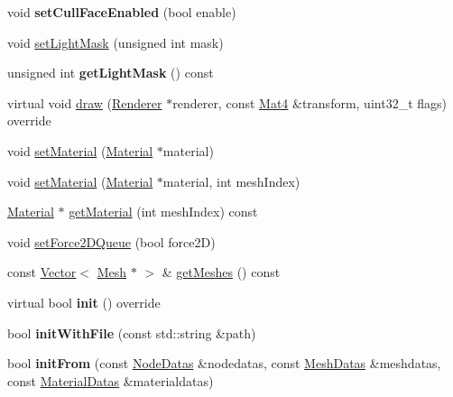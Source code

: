\begin{DoxyCompactItemize}
\item 
\mbox{\label{classSprite3D_acaf719386b479287dc199d9e3eaca85c}} 
void {\bfseries set\+Cull\+Face\+Enabled} (bool enable)
\item 
void \hyperlink{classSprite3D_a0fa47c29a1b6e9cf7a0a2eaa45c1e43a}{set\+Light\+Mask} (unsigned int mask)
\item 
\mbox{\label{classSprite3D_a1fc8414da76ad447824a6053c8ae1a5d}} 
unsigned int {\bfseries get\+Light\+Mask} () const
\item 
virtual void \hyperlink{classSprite3D_a6f6acba3ad6ba8cef63e6cc727df88ab}{draw} (\hyperlink{classRenderer}{Renderer} $\ast$renderer, const \hyperlink{classMat4}{Mat4} \&transform, uint32\+\_\+t flags) override
\item 
void \hyperlink{classSprite3D_ac984a24d1e5fc0e9071eef14e5041c42}{set\+Material} (\hyperlink{classMaterial}{Material} $\ast$material)
\item 
void \hyperlink{classSprite3D_a83fef9c35a0cb8866426b3e709ed5fab}{set\+Material} (\hyperlink{classMaterial}{Material} $\ast$material, int mesh\+Index)
\item 
\hyperlink{classMaterial}{Material} $\ast$ \hyperlink{classSprite3D_ac30aca9c7b7993d49c68cb6c56863e05}{get\+Material} (int mesh\+Index) const
\item 
void \hyperlink{classSprite3D_af1ed52e0440a81ce14577834b5073e1d}{set\+Force2\+D\+Queue} (bool force2D)
\item 
const \hyperlink{classVector}{Vector}$<$ \hyperlink{classMesh}{Mesh} $\ast$ $>$ \& \hyperlink{classSprite3D_a024e3c351fa61b0a8c39dfcd2ee3dd0e}{get\+Meshes} () const
\item 
\mbox{\label{classSprite3D_a2203cda5c4bd1e98d7ebb1eabe276ab0}} 
virtual bool {\bfseries init} () override
\item 
\mbox{\label{classSprite3D_ac275f6c8628e0a40438b4c6f9033b0b7}} 
bool {\bfseries init\+With\+File} (const std\+::string \&path)
\item 
\mbox{\label{classSprite3D_a60e445c03edcf02cdfbc40391f4ccaba}} 
bool {\bfseries init\+From} (const \hyperlink{structNodeDatas}{Node\+Datas} \&nodedatas, const \hyperlink{structMeshDatas}{Mesh\+Datas} \&meshdatas, const \hyperlink{structMaterialDatas}{Material\+Datas} \&materialdatas)

\end{DoxyCompactItemize}
